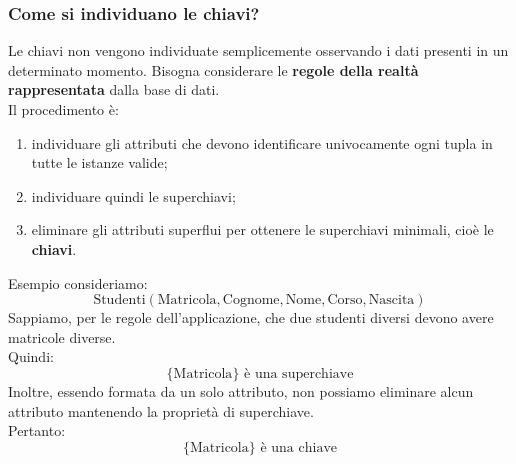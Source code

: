 
\subsubsection{Come si individuano le chiavi?}
Le chiavi non vengono individuate semplicemente osservando i dati
presenti in un determinato momento.
Bisogna considerare le \textbf{regole della realtà rappresentata}
dalla base di dati.\\
Il procedimento è:
\begin{enumerate}
    \item individuare gli attributi che devono identificare univocamente
    ogni tupla in tutte le istanze valide;

    \item individuare quindi le superchiavi;

    \item eliminare gli attributi superflui per ottenere le
    superchiavi minimali, cioè le \textbf{chiavi}.
\end{enumerate}
\noindent \textcolor{verdeEsempio}{Esempio}
consideriamo:
\[
\text{Studenti}(
\text{Matricola},
\text{Cognome},
\text{Nome},
\text{Corso},
\text{Nascita})
\]
Sappiamo, per le regole dell'applicazione, che due studenti diversi
devono avere matricole diverse.\\
Quindi:
\[
\boxed{
\{\text{Matricola}\} \text{ è una superchiave}
}
\]
Inoltre, essendo formata da un solo attributo, non possiamo eliminare
alcun attributo mantenendo la proprietà di superchiave.\\
Pertanto:
\[
\boxed{
\{\text{Matricola}\} \text{ è una chiave}
}
\]

